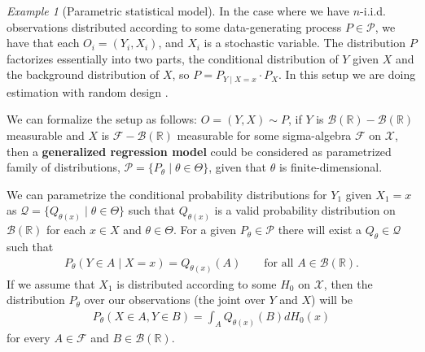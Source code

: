 \documentclass[11pt, a4paper]{article}
\theoremstyle{definition}
\theoremstyle{remark}
\newtheorem{example}{Example}
\newcommand{\btheta}{\theta}
\begin{document}
\begin{example}[Parametric statistical model] \label{ex:parametricfam}
    In the case where we have $ n $-i.i.d. observations distributed according to some data-generating process $ P \in \mathcal{P} $, we have that each $ O_i = (Y_i , X_i) $, and $ X_i $ is a stochastic variable. The distribution $ P $ factorizes essentially into two parts, the conditional distribution of $ Y $ given $ X $ and the background distribution of $ X $, so $ P = P_{Y \mid X = x} \cdot P_X $. In this setup we are doing estimation with random design \cite{gyorfi2002distribution}.  

We can formalize the setup as follows: $ O = (Y, X) \sim P $, if $ Y $ is $ \mathcal{B}(\mathbb{R})-\mathcal{B}(\mathbb{R}) $ measurable and $ X $ is $ \mathcal{F} - \mathcal{B}(\mathbb{R})  $ measurable for some sigma-algebra $ \mathcal{F} $ on $ \mathcal{X} $, then a \textbf{generalized regression model} could be considered as parametrized family of distributions, $ \mathcal{P} = \{P_{\btheta} \mid \btheta \in \Theta\} $, given that $ \btheta $ is finite-dimensional.

    We can parametrize the conditional probability distributions for $ Y_1 $ given $ X_1 = x $ as $ \mathcal{Q} = \{Q_{\btheta(x)} \mid \btheta \in \Theta \} $ such that $ Q_{\btheta(x)} $ is a valid probability distribution on $ \mathcal{B}(\mathbb{R}) $ for each $ x \in X $ and $ \btheta \in \Theta $. For a given $ P_{\btheta} \in \mathcal{P} $ there will exist a $ Q_{\btheta} \in \mathcal{Q} $ such that  
    \begin{align*}
        P_{\btheta}(Y \in A \mid X = x) = Q_{ \btheta(x)}(A) \qquad \text{for all } A \in \mathcal{B}(\mathbb{R}).
    \end{align*}
    If we assume that $ X_1 $ is distributed according to some $ H_0 $ on $ \mathcal{X} $, then the distribution $ P_{\btheta} $ over our observations (the joint over $ Y $ and $ X $) will be
    \begin{align*}
        P_{\btheta }(X \in A, Y \in B ) = \int_{A} Q_{\btheta(x)}(B) d H_{0}(x) 
    \end{align*}
    for every $ A \in \mathcal{F} $ and $ B \in \mathcal{B}(\mathbb{R}) $. 
\end{example}
\end{document}

